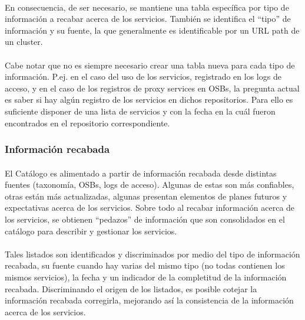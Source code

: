\paragraph{}
En consecuencia, de ser necesario, se mantiene una tabla espec\'ifica por
tipo de informaci\'on a recabar acerca de los servicios.
Tambi\'en se identifica el ``tipo'' de informaci\'on y
su fuente, la que generalmente es identificable por un URL path de un cluster.

\paragraph{}
Cabe notar que no es siempre necesario crear una tabla nueva para cada tipo de informaci\'on.
P.ej. en el caso del uso de los servicios, registrado en los logs de acceso,
y en el caso de los registros de proxy services en OSBs,
la pregunta actual es saber si hay alg\'un registro de los servicios en dichos repositorios.
%
Para ello es suficiente disponer de una lista de servicios y con la fecha en la cu\'al
fueron encontrados en el repositorio correspondiente.


\subsubsection{Informaci\'on recabada}
\paragraph{}
El Cat\'alogo es alimentado a partir de informaci\'on recabada desde distintas fuentes
(taxonom\'ia, OSBs, logs de acceso).
Algunas de estas son m\'as confiables, otras est\'an m\'as actualizadas,
algunas presentan elementos de planes futuros y expectativas acerca de los servicios.
%
Sobre todo al recabar informaci\'on acerca de los servicios, se obtienen ``pedazos''
de informaci\'on que son consolidados en el cat\'alogo
para describir y gestionar los servicios.

\paragraph{}
Tales listados son identificados y discriminados
por medio del tipo de informaci\'on recabada,
su fuente cuando hay varias del mismo tipo (no todas contienen los mismos servicios),
la fecha y un indicador de la completitud de la informaci\'on recabada.
%
Discriminando el origen de los listados, es posible cotejar la informaci\'on recabada
corregirla, mejorando as\'i la consistencia de la informaci\'on acerca de los servicios.

